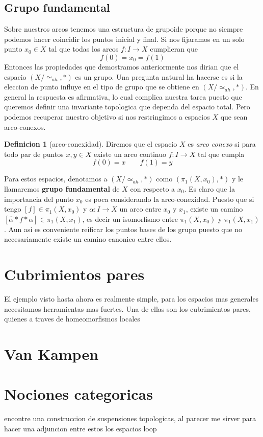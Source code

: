 \documentclass[letterpaper]{article}
\theoremstyle{definition}
\newtheorem{definicion}{Definicion}
\theoremstyle{plain}
\theoremstyle{plain}
\theoremstyle{remark}
\begin{document}
\subsection{Grupo fundamental}
Sobre nuestros arcos tenemos una estructura de grupoide porque no siempre
podemos hacer coincidir los puntos inicial y final. Si nos fijaramos en
un solo punto \(x_0 \in X\) tal que todas los arcos \(f : I \to X\)
cumplieran que
\[ f(0) = x_0 = f (1) \]
Entonces las propiedades que demostramos anteriormente nos dirian que el
espacio \((X / \simeq_{ah}, *)\) es un grupo. Una pregunta natural ha
hacerse es si la eleccion de punto influye en el tipo de grupo que se
obtiene en \((X / \simeq_{ah}, *)\). En general la respuesta es
afirmativa, lo cual complica nuestra tarea puesto que queremos definir
una invariante topologica que dependa del espacio total. Pero podemos
recuperar nuestro objetivo si nos restringimos a espacios \(X\) que sean
arco-conexos.
\begin{definicion}[arco-conexidad]
  Diremos que el espacio \(X\) es \emph{arco conexo} si para todo par de
  puntos \(x,y \in X\) existe un arco continuo \(f : I \to X\) tal que
  cumpla
  \[ f(0) = x \qquad f(1) = y \]
\end{definicion}
Para estos espacios, denotamos a \((X / \simeq_{ah}, *)\) como
\((\pi_1(X,x_0), *)\) y le llamaremos \textbf{grupo fundamental} de \(X\) con
respecto a \(x_0\). Es claro que la importancia del punto \(x_0\) es poca
considerando la arco-conexidad. Puesto que si tengo \([f] \in
\pi_1(X,x_0)\) y \(\alpha : I \to X\) un arco entre \(x_0\) y \(x_1\),
existe un camino \([\hat{\alpha} * f * \alpha] \in \pi_1(X,x_1)\), es
decir un isomorfismo entre \(\pi_1 (X, x_0)\) y \(\pi_1 (X, x_1)\). Aun
asi es conveniente reificar los puntos bases de los grupo puesto que no
necesariamente existe un camino canonico entre ellos.

\section{Cubrimientos pares}
El ejemplo visto hasta ahora es realmente simple, para los espacios mas
generales necesitamos herramientas mas fuertes. Una de ellas son los
cubrimientos pares, quienes a traves de homeomorfismos locales
\section{Van Kampen}

\section{Nociones categoricas}
encontre una construccion de suspensiones topologicas, al parecer me
sirver para hacer una adjuncion entre estos los espacios loop
\end{document}
